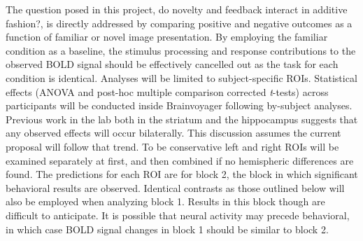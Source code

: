 \documentclass[doc]{apa}        %
\begin{document}
The question posed in this project, do novelty and feedback interact in additive fashion?, is directly addressed by comparing positive and negative  outcomes as a function of familiar or novel image presentation.  By employing the familiar condition as a baseline, the stimulus processing and response contributions to the observed BOLD signal should be effectively cancelled out as the task for each condition is identical. Analyses will be limited to subject-specific ROIs.  Statistical effects (ANOVA and post-hoc multiple comparison corrected \emph{t}-tests) across participants will be conducted inside Brainvoyager following by-subject analyses. Previous work in the lab both in the striatum and the hippocampus suggests that any observed effects will occur bilaterally.  This discussion assumes the current proposal will follow that trend.  To be conservative left and right ROIs will be examined  separately at first, and then combined if no hemispheric differences are found.  The predictions for each ROI are for block 2, the block in which significant behavioral results are observed.  Identical contrasts as those outlined below will also be employed when analyzing block 1.  Results in this block though are difficult to anticipate.  It is possible that neural activity may precede behavioral, in which case BOLD signal changes in block 1 should be similar to block 2.
\end{document}
